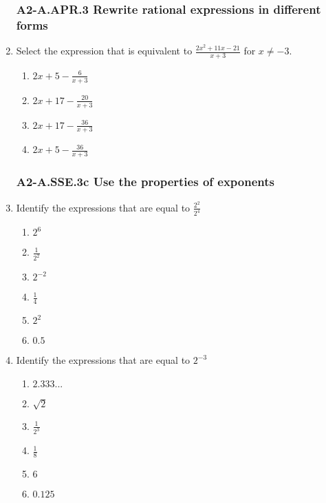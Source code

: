 \documentclass[12pt, twoside]{article}
\begin{document}
\begin{enumerate}[itemsep=0.5cm]
\subsubsection*{A2-A.APR.3 Rewrite rational expressions in different forms}
\item Select the expression that is equivalent to $\displaystyle \frac{2x^2 + 11x - 21}{x+3}$ for $x \neq -3$.
    \begin{enumerate}
        \item $\displaystyle 2x + 5 - \frac{6}{x + 3}$
        \item $\displaystyle 2x + 17 - \frac{20}{x + 3}$
        \item $\displaystyle 2x + 17 - \frac{36}{x + 3}$
        \item $\displaystyle 2x + 5 - \frac{36}{x + 3}$
    \end{enumerate} \vspace{3cm}

\newpage
\subsubsection*{A2-A.SSE.3c Use the properties of exponents}
\item Identify the expressions that are equal to $\displaystyle \frac{2^2}{2^4}$
    \begin{multicols}{2}
    \begin{enumerate}
        \item $2^6$
        \item $\displaystyle \frac{1}{2^2}$
        \item $2^{-2}$
        \item $\frac{1}{4}$
        \item $2^{2}$
        \item $0.5$
    \end{enumerate}
    \end{multicols}

\item Identify the expressions that are equal to $\displaystyle 2^{-3}$
    \begin{multicols}{2}
    \begin{enumerate}
        \item $2.333...$
        \item $\sqrt{2}$
        \item $\displaystyle \frac{1}{2^3}$
        \item $\displaystyle \frac{1}{8}$
        \item $6$
        \item $0.125$
    \end{enumerate}
    \end{multicols}


\end{enumerate}
\end{document}
